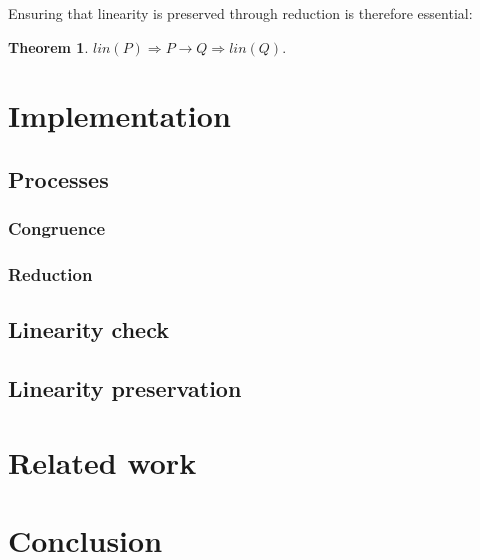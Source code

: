 \documentclass{mproj}
\newtheorem{theorem}{Theorem}
\begin{document}
Ensuring that linearity is preserved through reduction is therefore essential:
\begin{theorem}
    $lin(P) \Rightarrow P \rightarrow Q \Rightarrow lin(Q).$
\end{theorem}

\chapter{Implementation}\label{implementation}

\section{Processes}\label{processes}
\subsection{Congruence}
\subsection{Reduction}

\section{Linearity check}\label{linearity-check}

\section{Linearity preservation}\label{linearity-preservation}

\chapter{Related work}\label{related-work}

\chapter{Conclusion}\label{conclusion}



\end{document}

